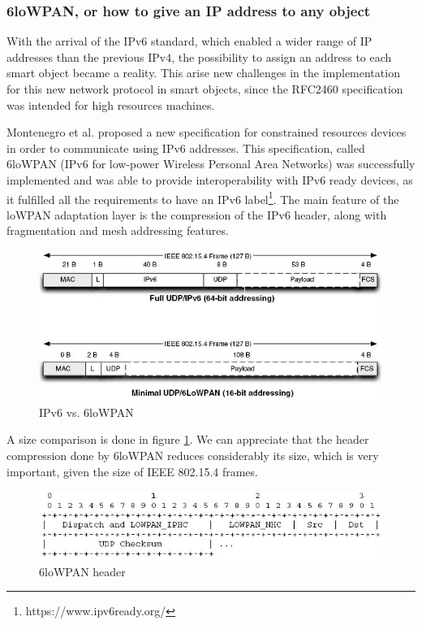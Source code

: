 \subsubsection{6loWPAN, or how to give an IP address to any object}
With the arrival of the IPv6 standard\cite{rfc2460}, which enabled a wider range of IP addresses than the previous IPv4, the possibility to assign an address to each smart object became a reality.
This arise new challenges in the implementation for this new network protocol in smart objects, since the RFC2460 specification was intended for high resources machines.

Montenegro et al. proposed a new specification\cite{rfc4944} for constrained resources devices in order to communicate using IPv6 addresses.
This specification, called 6loWPAN (IPv6 for low-power Wireless Personal Area Networks) was successfully implemented\cite{durvy08making} and was able to provide interoperability with IPv6 ready devices, as it fulfilled all the requirements to have an IPv6 label\footnote{https://www.ipv6ready.org/}.
The main feature of the loWPAN adaptation layer is the compression of the IPv6 header, along with fragmentation and mesh addressing features.

\begin{figure}[htb]
	\centering
	\includegraphics[width=1\columnwidth]{chapters/background.images/6lowpanvsipv6.jpg}
	\caption{IPv6 vs. 6loWPAN \cite{shelby2010embedded}}
	\label{fig:IPv6vs6loWPAN}
\end{figure}

A size comparison is done in figure \ref{fig:IPv6vs6loWPAN}.
We can appreciate that the header compression done by 6loWPAN reduces considerably its size, which is very important, given the size of IEEE 802.15.4 frames.

\begin{figure}[htb]
	\centering
	\includegraphics[width=1\columnwidth]{chapters/background.images/6lowpanDetails.jpg}
	\caption{6loWPAN header}
	\label{fig:6loWPANmin}
\end{figure}

